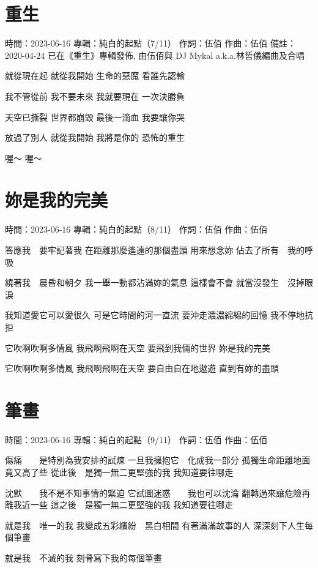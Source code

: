 \documentclass[UTF8,a4paper,oneside,twocolumn,12pt]{ctexbook}
\newcommand{\infopair}[2]{\textbullet #1：#2}
\newcommand{\zc}[1][伍佰]{\infopair{作詞}{#1}}
\newcommand{\zq}[1][伍佰]{\infopair{作曲}{#1}}
\newcommand{\zj}[1]{\infopair{專輯}{#1}}
\newcommand{\sj}[1]{\infopair{時間}{#1}}
\newcommand{\bz}[1]{\infopair{備註}{#1}}
\newenvironment{info}{\begin{flushleft}\kaishu
	}
	{\end{flushleft}\normalsize\yahei\par}
\newenvironment{lyric}{
	}
{}
\begin{document}
\section{重生}
\begin{info}
	\sj{2023-06-16}
	\zj{純白的起點（7/11）}
	\zc
	\zq
	\bz{2020-04-24 已在《重生》專輯發佈, 由伍佰與 DJ Mykal a.k.a.林哲儀編曲及合唱}
\end{info}
\begin{lyric}
	就從現在起 就從我開始
	生命的惡魔 看誰先認輸

	我不管從前 我不要未來
	我就要現在 一次決勝負

	天空已撕裂 世界都崩毀
	最後一滴血 我要讓你哭

	放過了別人 就從我開始
	我將是你的 恐怖的重生

	喔～
	喔～
\end{lyric}

\section{妳是我的完美}
\begin{info}
	\sj{2023-06-16}
	\zj{純白的起點（8/11）}
	\zc
	\zq
\end{info}
\begin{lyric}
	答應我　要牢記著我
	在距離那麼遙遠的那個盡頭
	用來想念妳
	佔去了所有　我的呼吸

	繞著我　晨昏和朝夕
	我一舉一動都沾滿妳的氣息
	這樣會不會
	就當沒發生　沒掉眼淚

	我知道愛它可以愛很久
	可是它時間的河一直流
	要沖走濃濃綿綿的回憶
	我不停地抗拒

	它吹啊吹啊多情風
	我飛啊飛啊在天空
	要飛到我倆的世界
	妳是我的完美

	它吹啊吹啊多情風
	我飛啊飛啊在天空
	要自由自在地遨遊
	直到有妳的盡頭
\end{lyric}

\section{筆畫}
\begin{info}
	\sj{2023-06-16}
	\zj{純白的起點（9/11）}
	\zc
	\zq
\end{info}
\begin{lyric}
	傷痛　　是特別為我安排的試煉
	一旦我擁抱它　化成我一部分
	孤獨生命距離地面竟又高了些
	從此後　是獨一無二更堅強的我
	我知道要往哪走

	沈默　　我不是不知事情的緊迫
	它試圖迷惑　　我也可以沈淪
	翻轉過來讓危險再離我近一些
	這之後　是獨一無二更堅強的我
	我知道要往哪走

	就是我　唯一的我
	我變成五彩繽紛　黑白相間
	有著滿滿故事的人
	深深刻下人生每個筆畫

	就是我　不滅的我
	刻骨寫下我的每個筆畫
\end{lyric}
\end{document}
